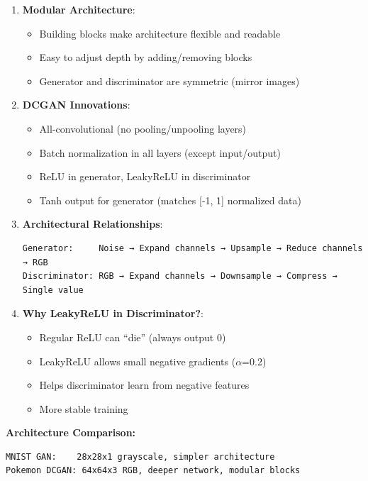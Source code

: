 \documentclass[11pt]{article}
\providecommand{\tightlist}{%
      \setlength{\itemsep}{0pt}\setlength{\parskip}{0pt}}
\begin{document}
\begin{enumerate}
\def\labelenumi{\arabic{enumi}.}
\item
  \textbf{Modular Architecture}:

  \begin{itemize}
  \tightlist
  \item
    Building blocks make architecture flexible and readable
  \item
    Easy to adjust depth by adding/removing blocks
  \item
    Generator and discriminator are symmetric (mirror images)
  \end{itemize}
\item
  \textbf{DCGAN Innovations}:

  \begin{itemize}
  \tightlist
  \item
    All-convolutional (no pooling/unpooling layers)
  \item
    Batch normalization in all layers (except input/output)
  \item
    ReLU in generator, LeakyReLU in discriminator
  \item
    Tanh output for generator (matches {[}-1, 1{]} normalized data)
  \end{itemize}
\item
  \textbf{Architectural Relationships}:

\begin{verbatim}
Generator:     Noise → Expand channels → Upsample → Reduce channels → RGB
Discriminator: RGB → Expand channels → Downsample → Compress → Single value
\end{verbatim}
\item
  \textbf{Why LeakyReLU in Discriminator?}:

  \begin{itemize}
  \tightlist
  \item
    Regular ReLU can ``die'' (always output 0)
  \item
    LeakyReLU allows small negative gradients (\(\alpha\)=0.2)
  \item
    Helps discriminator learn from negative features
  \item
    More stable training
  \end{itemize}
\end{enumerate}

\textbf{Architecture Comparison:}

\begin{verbatim}
MNIST GAN:    28x28x1 grayscale, simpler architecture
Pokemon DCGAN: 64x64x3 RGB, deeper network, modular blocks
\end{verbatim}
\end{document}
